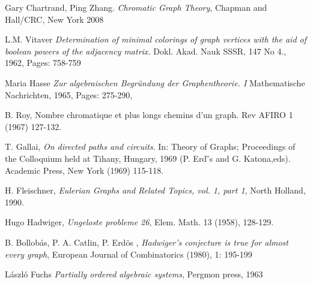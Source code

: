 {\begin{thebibliography}{9}
 Gary Chartrand, Ping Zhang. \textit{Chromatic Graph Theory}, Chapman and Hall/CRC, New York 2008

 L.M. Vitaver \textit{Determination of minimal colorings of graph vertices with the aid of boolean powers of the adjacency matrix.} Dokl. Akad. Nauk SSSR, 147 No 4., 1962, Pages: 758-759

 Maria Hasse \textit{Zur algebraischen Begr\"undung der Graphentheorie. I} Mathematische Nachrichten, 1965, Pages: 275-290,

B. Roy, Nombre chromatique et plus longs chemins d'un graph. Rev AFIRO
1 (1967) 127-132.

\newpage

T. Gallai, \textit{On directed paths and circuits}. In: Theory of Graphs; Proceedings of the Colloquium held at Tihany, Hungary, 1969 (P. Erd ̋s and G. Katona,eds). Academic Press, New York (1969) 115-118.

 H. Fleischner, \textit{Eulerian Graphs and Related Topics, vol. 1, part 1}, North Holland, 1990.

 Hugo Hadwiger, \textit{Ungeloste probleme 26}, Elem. Math. 13 (1958), 128-129.

 B. Bollobás, P. A. Catlin, P.  Erd\"os , \textit{Hadwiger's conjecture is true for almost every graph}, European Journal of Combinatorics (1980), 1: 195-199

  L\'aszl\'o Fuchs \textit{Partially ordered algebraic systems}, Pergmon press, 1963

\end{thebibliography}
}